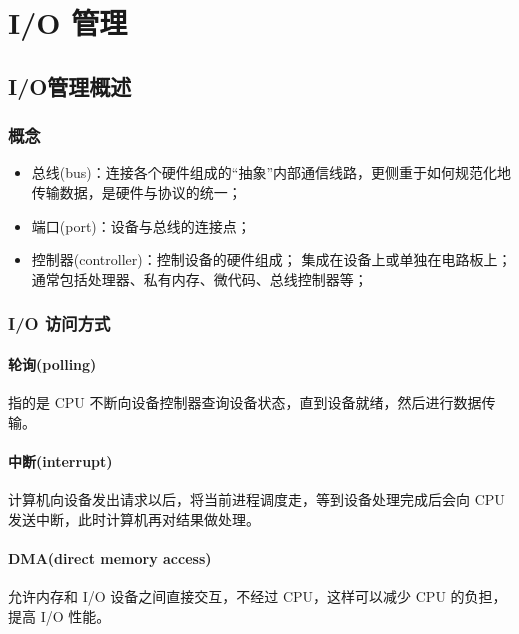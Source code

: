 \section{I/O 管理}
\subsection{I/O管理概述}

\subsubsection{概念}
\begin{itemize}
    \item 总线(bus)：连接各个硬件组成的“抽象”内部通信线路，更侧重于如何规范化地传输数据，是硬件与协议的统一；
    \item 端口(port)：设备与总线的连接点；
    \item 控制器(controller)：控制设备的硬件组成；
    \subitem 集成在设备上或单独在电路板上；
    \subitem 通常包括处理器、私有内存、微代码、总线控制器等；
\end{itemize}

\subsubsection{I/O 访问方式}
\paragraph{轮询(polling)}指的是 CPU 不断向设备控制器查询设备状态，直到设备就绪，然后进行数据传输。

\paragraph{中断(interrupt)}计算机向设备发出请求以后，将当前进程调度走，等到设备处理完成后会向 CPU 发送中断，此时计算机再对结果做处理。

\paragraph{DMA(direct memory access)}允许内存和 I/O 设备之间直接交互，不经过 CPU，这样可以减少 CPU 的负担，提高 I/O 性能。

